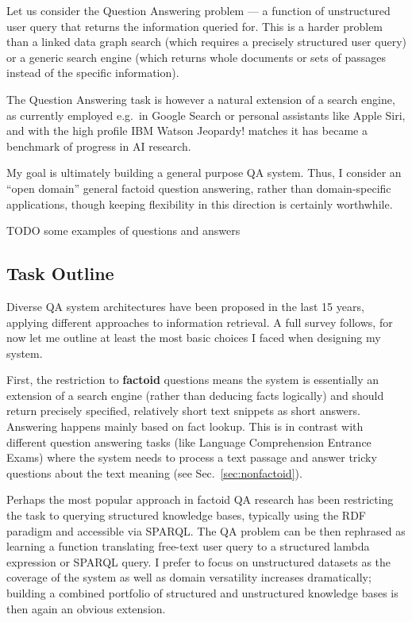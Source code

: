 Let us consider the Question Answering problem --- a function of
unstructured user query that returns the information queried for.
This is a harder problem than a linked data graph search (which requires
a precisely structured user query) or a generic search engine (which
returns whole documents or sets of passages instead of the specific
information).

The Question Answering task is however a natural extension of a search
engine, as currently employed e.g.\ in Google Search \citep{googleKG}
or personal assistants like Apple Siri, and with the high
profile IBM Watson Jeopardy! matches \citep{WatsonOverview}
it has became a benchmark of progress in AI research.

My goal is ultimately building a general purpose QA system.
Thus, I consider an ``open domain'' general factoid question answering,
rather than domain-specific applications, though keeping flexibility
in this direction is certainly worthwhile.

TODO some examples of questions and answers

\subsection{Task Outline}

Diverse QA system architectures have been proposed in the last 15 years,
applying different approaches to information retrieval.  A full survey
follows, for now let me outline at least the most basic choices I faced
when designing my system.

First, the restriction to \textbf{factoid} questions means the system
is essentially an extension of a search engine (rather than deducing
facts logically) and should return precisely specified, relatively short
text snippets as short answers.  Answering happens mainly based on fact
lookup.  This is in contrast with different question answering tasks
(like Language Comprehension Entrance Exams) where the system needs to
process a text passage and answer tricky questions about the text meaning
(see Sec.~\ref{sec:nonfactoid}).

Perhaps the most popular approach in factoid QA research has been restricting
the task to querying structured knowledge bases, typically using the
RDF paradigm and accessible via SPARQL\@.  The QA problem can
be then rephrased as learning a function translating free-text user query
to a structured lambda expression or SPARQL query. \citep{Semantic2013Berant, Semantic2014Bordes}
I prefer to focus on unstructured datasets as the coverage of the system
as well as domain versatility increases dramatically; building a combined
portfolio of structured and unstructured knowledge bases
is then again an obvious extension.

